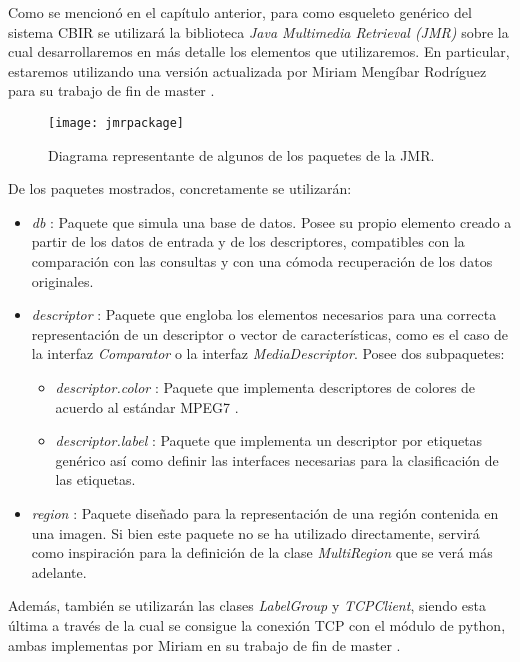 Como se mencionó en el capítulo anterior, para como esqueleto genérico del sistema CBIR se utilizará la biblioteca \emph{Java Multimedia Retrieval (JMR)} \cite{JMR} sobre la cual desarrollaremos en más detalle los elementos que utilizaremos. En particular, estaremos utilizando una versión actualizada por Miriam Mengíbar Rodríguez para su trabajo de fin de master \cite{TFM}.\\

\begin{figure}[htpb]
  \centering
  \texttt{[image: jmrpackage]}
  \caption{Diagrama representante de algunos de los paquetes de la JMR. \cite{JMR}}
  \label{fig:jmrpackage}
\end{figure}

De los paquetes mostrados, concretamente se utilizarán:
\begin{itemize}
\item \emph{db} : Paquete que simula una base de datos. Posee su propio elemento creado a partir de los datos de entrada y de los descriptores, compatibles con la comparación con las consultas y con una cómoda recuperación de los datos originales.
\item \emph{descriptor} : Paquete que engloba los elementos necesarios para una correcta representación de un descriptor o vector de características, como es el caso de la interfaz \emph{Comparator} o la interfaz \emph{MediaDescriptor}. Posee dos subpaquetes:
\begin{itemize}
\item \emph{descriptor.color} : Paquete que implementa descriptores de colores de acuerdo al estándar MPEG7 \cite{MPEG7}.
\item \emph{descriptor.label} : Paquete que implementa un descriptor por etiquetas genérico así como definir las interfaces necesarias para la clasificación de las etiquetas.
\end{itemize}
\item \emph{region} : Paquete diseñado para la representación de una región contenida en una imagen. Si bien este paquete no se ha utilizado directamente, servirá como inspiración para la definición de la clase \emph{MultiRegion} que se verá más adelante.
\end{itemize}

Además, también se utilizarán las clases \emph{LabelGroup} y \emph{TCPClient}, siendo esta última a través de la cual se consigue la conexión TCP con el módulo de python, ambas implementas por Miriam en su trabajo de fin de master \cite{TFM}.


